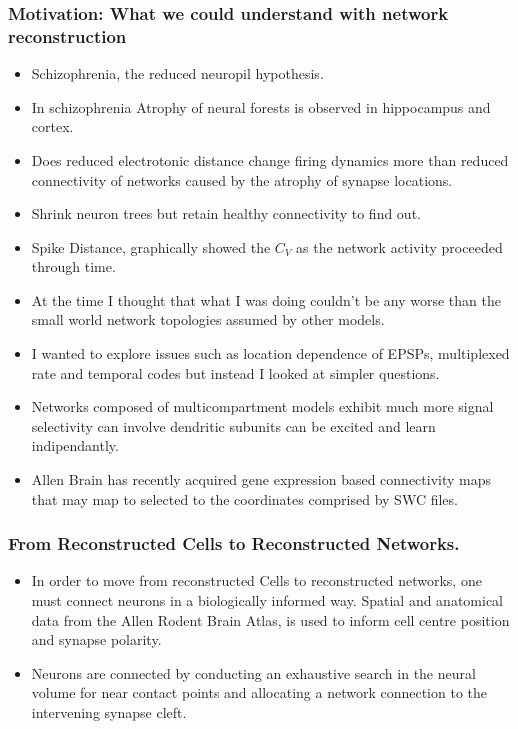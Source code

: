 \documentclass{beamer}
\begin{document}
\begin{frame}
\frametitle{Motivation: What we could understand with network reconstruction}%
\begin{itemize}
\vfill\item Schizophrenia, the reduced neuropil hypothesis.
\vfill\item In schizophrenia Atrophy of neural forests is observed in hippocampus and cortex.
\vfill\item Does reduced electrotonic distance change firing dynamics more than reduced connectivity of networks caused by the atrophy of synapse locations.
\vfill\item Shrink neuron trees but retain healthy connectivity to find out.
\vfill\item Spike Distance, graphically showed the $C_{V}$ as the network activity proceeded through time. 
\vfill\item At the time I thought that what I was doing couldn't be any worse than the small world network topologies assumed by other models.
\vfill\item I wanted to explore issues such as location dependence of EPSPs, multiplexed rate and temporal codes but instead I looked at simpler questions.
\vfill\item Networks composed of multicompartment models exhibit much more signal selectivity can involve dendritic subunits can be excited and learn indipendantly.
\vfill\item Allen Brain has recently acquired gene expression based connectivity maps that may map to selected to the coordinates comprised by SWC files.
\end{itemize}
\end{frame}

\begin{frame}
	\frametitle{From Reconstructed Cells to Reconstructed Networks.}

	\begin{itemize}
		\vfill \item In order to move from reconstructed Cells to reconstructed networks, one must connect neurons in a biologically informed way. Spatial and anatomical data from the Allen Rodent Brain Atlas, is used to inform cell centre position and synapse polarity.
		
		\vfill \item Neurons are connected by conducting an exhaustive search in the neural volume for near contact points and allocating a network connection to the intervening synapse cleft.
		
	\end{itemize}
\end{frame}
\end{document}
